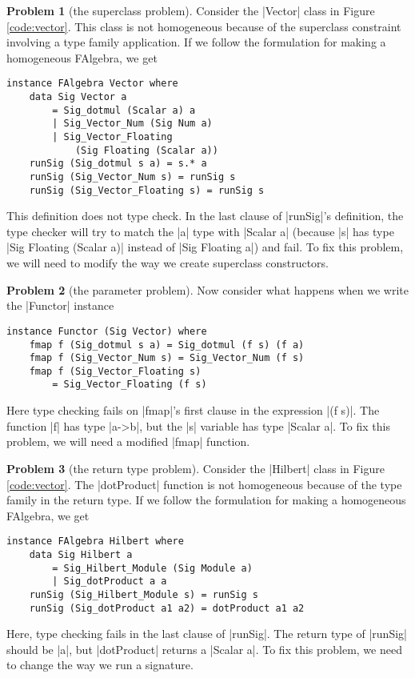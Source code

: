 \documentclass[preprint]{sigplanconf}
\theoremstyle{definition}
\newtheorem{problem}{Problem}
\begin{document}
\begin{problem}[the superclass problem]
Consider the |Vector| class in Figure \ref{code:vector}.
This class is not homogeneous because of the superclass constraint involving a type family application.
If we follow the formulation for making a homogeneous FAlgebra, we get
\begin{lstlisting}
instance FAlgebra Vector where
    data Sig Vector a
        = Sig_dotmul (Scalar a) a
        | Sig_Vector_Num (Sig Num a)
        | Sig_Vector_Floating
            (Sig Floating (Scalar a))
    runSig (Sig_dotmul s a) = s.* a
    runSig (Sig_Vector_Num s) = runSig s
    runSig (Sig_Vector_Floating s) = runSig s
\end{lstlisting}
This definition does not type check.
In the last clause of |runSig|'s definition,
the type checker will try to match the |a| type with |Scalar a| (because |s| has type |Sig Floating (Scalar a)| instead of |Sig Floating a|) and fail.
To fix this problem, we will need to modify the way we create superclass constructors.
\end{problem}

\begin{problem}[the parameter problem]
Now consider what happens when we write the |Functor| instance
\begin{lstlisting}
instance Functor (Sig Vector) where
    fmap f (Sig_dotmul s a) = Sig_dotmul (f s) (f a)
    fmap f (Sig_Vector_Num s) = Sig_Vector_Num (f s)
    fmap f (Sig_Vector_Floating s)
        = Sig_Vector_Floating (f s)
\end{lstlisting}
Here type checking fails on |fmap|'s first clause in the expression |(f s)|.
The function |f| has type |a->b|, but the |s| variable has type |Scalar a|.
To fix this problem, we will need a modified |fmap| function.
\end{problem}

\begin{problem}[the return type problem]
Consider the |Hilbert| class in Figure \ref{code:vector}.
The |dotProduct| function is not homogeneous because of the type family in the return type.
If we follow the formulation for making a homogeneous FAlgebra, we get
\begin{lstlisting}
instance FAlgebra Hilbert where
    data Sig Hilbert a
        = Sig_Hilbert_Module (Sig Module a)
        | Sig_dotProduct a a
    runSig (Sig_Hilbert_Module s) = runSig s
    runSig (Sig_dotProduct a1 a2) = dotProduct a1 a2
\end{lstlisting}
Here, type checking fails in the last clause of |runSig|.
The return type of |runSig| should be |a|,
but |dotProduct| returns a |Scalar a|.
To fix this problem, we need to change the way we run a signature.
\end{problem}
\end{document}
